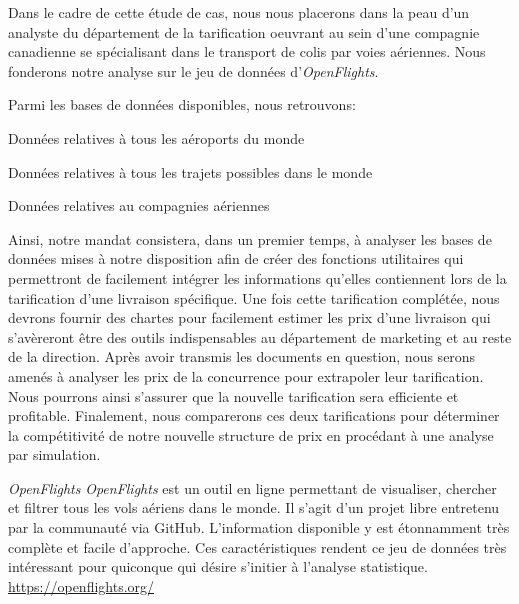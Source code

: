 Dans le cadre de cette étude de cas, nous nous placerons dans la peau d'un analyste du département de la tarification oeuvrant au sein d'une compagnie canadienne se spécialisant dans le transport de colis par voies aériennes. Nous fonderons notre analyse sur le jeu de données d'\emph{OpenFlights}. \cite{OpenFlightsData} 


Parmi les bases de données disponibles, nous retrouvons: \\

\begin{description}[style=multiline,leftmargin=2.5cm]
	\item[airports.dat] Données relatives à tous les aéroports du monde \cite{Data:RouteWorldwide}
	\item[routes.dat] Données relatives à tous les trajets possibles dans le monde \cite{Data:AirportWorldwide}
	\item[airlines.dat] Données relatives au compagnies aériennes \cite{Data:AirlineWorldWide}
\end{description}

\vspace{\baselineskip}
Ainsi, notre mandat consistera, dans un premier temps, à analyser les bases de données mises à notre disposition afin de créer des fonctions utilitaires qui permettront de facilement intégrer les informations qu'elles contiennent lors de la tarification d'une livraison spécifique. Une fois cette tarification complétée, nous devrons fournir des chartes pour facilement estimer les prix d'une livraison qui s'avèreront être des outils indispensables au département de marketing et au reste de la direction. Après avoir transmis les documents en question, nous serons amenés à analyser les prix de la concurrence pour extrapoler leur tarification. Nous pourrons ainsi s'assurer que la nouvelle tarification sera efficiente et profitable. Finalement, nous comparerons ces deux tarifications pour déterminer la compétitivité de notre nouvelle structure de prix en procédant à une analyse par simulation. \\

\begin{moreInfo}{\emph{OpenFlights}}
	\emph{OpenFlights} est un outil en ligne permettant de visualiser, chercher et filtrer tous les vols aériens dans le monde. Il s’agit d’un projet libre entretenu par la communauté via GitHub. \cite{GitHub} L’information disponible y est étonnamment très complète et facile d’approche. Ces caractéristiques rendent ce jeu de données très intéressant pour quiconque qui désire s’initier à l’analyse statistique. \\
	\url{https://openflights.org/}
\end{moreInfo}

